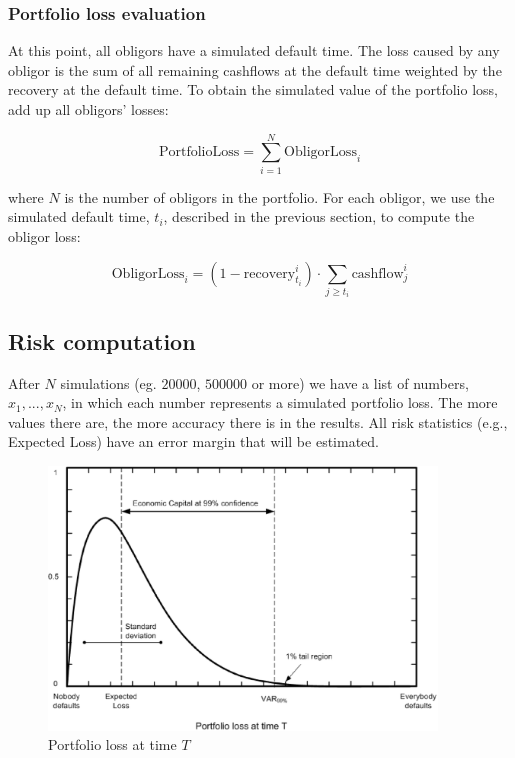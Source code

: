 \documentclass[a4paper,12pt,final]{article}
\begin{document}
\subsubsection{Portfolio loss evaluation}
\label{sec:portfolioloss}
At this point, all obligors have a simulated default time. The loss
caused by any obligor is the sum of all remaining cashflows at the default time 
weighted by the recovery at the default time. To obtain the simulated 
value of the portfolio loss, add up all obligors' losses:

\begin{displaymath}
\mathrm{PortfolioLoss} = \sum_{i=1}^N \mathrm{ObligorLoss}_i
\end{displaymath}

where $N$ is the number of obligors in the portfolio. For each obligor, we 
use the simulated default time, $t_i$, described in the previous section, to 
compute the obligor loss:

\begin{displaymath}
\mathrm{ObligorLoss}_{i} = (1 - \mathrm{recovery}_{t_i}^i) \cdot \sum_{j \ge {t_i}} \mathrm{cashflow}_{j}^i
\end{displaymath}

\subsection{Risk computation}
After $N$ simulations (eg. $20000$, $500000$ or more) we have a list
of numbers, ${x_1, ..., x_N}$, in which each number represents a simulated portfolio 
loss. The more values there are, the more accuracy there is in the results. All risk 
statistics (e.g., Expected Loss) have an error margin that will be estimated.
\newline

\begin{figure}[!hbt]
\begin{center}
\includegraphics[height=7cm, angle=0]{./images/creditvar.eps}
\caption{Portfolio loss at time $T$}
\label{creditvar}
\end{center}
\end{figure}
\FloatBarrier
\end{document}
